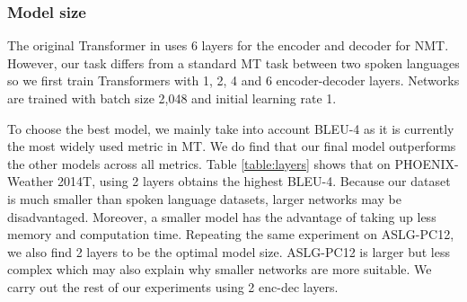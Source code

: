 \documentclass[11pt]{article}
\begin{document}
\subsubsection*{Model size}
The original Transformer in \cite{transformer} uses 6 layers for the encoder and decoder for NMT. However, our task differs from a standard MT task between two spoken languages so we first train Transformers with 1, 2, 4 and 6 encoder-decoder layers. Networks are trained with batch size 2,048 and initial learning rate 1. 

\begin{center}
\label{table:layers}
\end{center}

To choose the best model, we mainly take into account BLEU-4 as it is currently the most widely used metric in MT. We do find that our final model outperforms the other models across all metrics. Table \ref{table:layers} shows that on PHOENIX-Weather 2014T, using 2 layers obtains the highest BLEU-4. Because our dataset is much smaller than spoken language datasets, larger networks may be disadvantaged. Moreover, a smaller model has the advantage of taking up less memory and computation time. Repeating the same experiment on ASLG-PC12, we also find 2 layers to be the optimal model size. ASLG-PC12 is larger but less complex which may also explain why smaller networks are more suitable. We carry out the rest of our experiments using 2 enc-dec layers.
\end{document}
